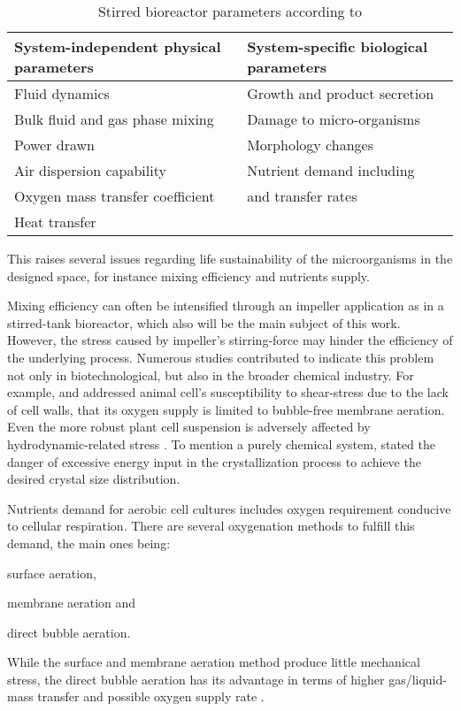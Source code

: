 \begin{table}[htbp]
    \centering
    \begin{tabular}{R{6.5cm}|L{6.5cm}}
        \toprule
        System-independent physical parameters  & System-specific biological parameters \\
        \hline
        Fluid dynamics                     & Growth and product secretion \\
        Bulk fluid and gas phase mixing    & Damage to micro-organisms \\
        Power drawn                        & Morphology changes \\
        Air dispersion capability          & Nutrient demand including  \\
        Oxygen mass transfer coefficient   &  and  transfer rates \\
        Heat transfer                      & \\
        \bottomrule
    \end{tabular} %
    \caption{Stirred bioreactor parameters according to \citet{nienow1998hydrodynamics}}
    \label{tab:1_bioreactor_parameters}
\end{table}

This raises several issues regarding life sustainability of the microorganisms in the designed space, for instance mixing efficiency and nutrients supply.

Mixing efficiency can often be intensified through an impeller application as in a stirred-tank bioreactor, which also will be the main subject of this work. However, the stress caused by impeller's stirring-force may hinder the efficiency of the underlying process. Numerous studies contributed to indicate this problem not only in biotechnological, but also in the broader chemical industry. For example, \citet{Frahm2007} and \citet{Henzler1993} addressed animal cell's susceptibility to shear-stress due to the lack of cell walls, that its oxygen supply is limited to bubble-free membrane aeration. Even the more robust plant cell suspension is adversely affected by hydrodynamic-related stress \citep{Eibl2009}. To mention a purely chemical system, \citet{Wollny2010Diss} stated the danger of excessive energy input in the crystallization process to achieve the desired crystal size distribution.

Nutrients demand for aerobic cell cultures includes oxygen requirement conducive to cellular respiration. There are several oxygenation methods to fulfill this demand, the main ones being:
\begin{inlineenum}
    \item surface aeration,
    \item membrane aeration and
    \item direct bubble aeration.
\end{inlineenum}
While the surface and membrane aeration method produce little mechanical stress, the direct bubble aeration has its advantage in terms of higher gas/liquid-mass transfer and possible oxygen supply rate \citep{Henzler1993}.


